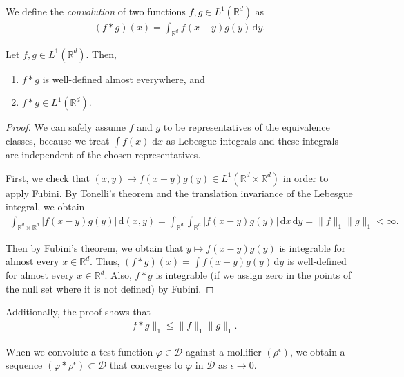 We define the \emph{convolution} of two functions \(f,g \in {L}^1(\mathbb{R}^d)\) as
\begin{align*}
    (f*g)(x) = \int_{\mathbb{R}^d} f(x - y)g(y) \, \mathrm{d}y.
\end{align*}

\begin{lemma}
    Let \(f,g \in {L}^1(\mathbb{R}^d)\). Then, 
    \begin{enumerate}
        \item \(f*g\) is well-defined almost everywhere, and 
        \item \(f*g \in {L}^1(\mathbb{R}^d)\).
    \end{enumerate}
\end{lemma}
\begin{proof}
    We can safely assume \(f\) and \(g\) to be representatives of the equivalence classes, because we  treat \(\int f(x) \; \mathrm{d}x\) as Lebesgue integrals and these integrals are independent of the chosen representatives.

    First, we check that \((x,y) \mapsto f(x-y)g(y) \in L^1(\mathbb{R}^d \times \mathbb{R}^d)\) in order to apply Fubini. By Tonelli's theorem and the translation invariance of the Lebesgue integral, we obtain
    \begin{align*}
        \int_{\mathbb{R}^d \times \mathbb{R}^d}|f(x-y)g(y)| \, \mathrm{d}(x,y) = \int_{\mathbb{R}^d}\int_{\mathbb{R}^d} |f(x-y)g(y)| \, \mathrm{d}x \, \mathrm{d}y = \lVert f \rVert_{1} \lVert g \rVert_{1} < \infty.
    \end{align*}

    Then by Fubini's theorem, we obtain that \(y \mapsto f(x-y)g(y)\) is integrable for almost every \(x \in \mathbb{R}^d\). Thus, \((f*g)(x) = \int f(x-y)g(y) \, \mathrm{d}y\) is well-defined for almost every \(x \in \mathbb{R}^d\). Also, \(f*g\) is integrable (if we assign zero in the points of the null set where it is not defined) by Fubini.
\end{proof}
Additionally, the proof shows that
\begin{align}\label{inequality:l1-norm}
    \lVert f*g \rVert_1 \leq \lVert f \rVert_{1} \lVert g \rVert_{1}.
\end{align}

When we convolute a test function \(\varphi \in \mathcal{D}\) against a mollifier \((\rho^\epsilon)\), we obtain a sequence \((\varphi * \rho^\epsilon) \subset \mathcal{D}\) that converges to \({\varphi}\) in \(\mathcal{D}\) as \(\epsilon \to 0\).  

